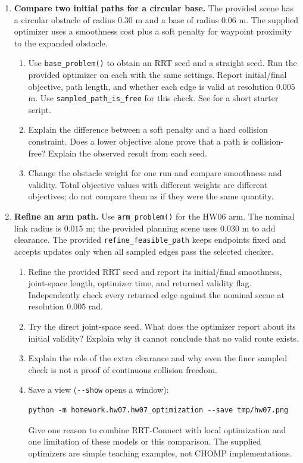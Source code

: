 \newpage
\begin{enumerate}[start=3]
\item \textbf{Compare two initial paths for a circular base.}
The provided scene has a circular obstacle of radius $0.30$ m and a base of
radius $0.06$ m. The supplied optimizer uses a smoothness cost plus a soft
penalty for waypoint proximity to the expanded obstacle.
\begin{enumerate}
\item Use \texttt{base\_problem()} to obtain an RRT seed and a straight seed.
Run the provided optimizer on each with the same settings. Report initial/final
objective, path length, and whether each edge is valid at resolution $0.005$ m.
Use \texttt{sampled\_path\_is\_free} for this check.
See  for a short starter script.
\item Explain the difference between a soft penalty and a hard collision
constraint. Does a lower objective alone prove that a path is collision-free?
Explain the observed result from each seed.
\item Change the obstacle weight for one run and compare smoothness and
validity. Total objective values with different weights are different
objectives; do not compare them as if they were the same quantity.
\end{enumerate}

\item \textbf{Refine an arm path.}
Use \texttt{arm\_problem()} for the HW06 arm. The nominal link radius is
$0.015$ m; the provided planning scene uses $0.030$ m to add clearance.
The provided \texttt{refine\_feasible\_path} keeps endpoints fixed and
accepts updates only when all sampled edges pass the selected checker.
\begin{enumerate}
\item Refine the provided RRT seed and report its initial/final smoothness,
joint-space length, optimizer time, and returned validity flag. Independently
check every returned edge against the nominal scene at resolution $0.005$ rad.
\item Try the direct joint-space seed. What does the optimizer report about
its initial validity? Explain why it cannot conclude that no valid route exists.
\item Explain the role of the extra clearance and why even the finer sampled
check is not a proof of continuous collision freedom.
\item Save a view (\texttt{-{}-show} opens a window):
\begin{lstlisting}
python -m homework.hw07.hw07_optimization --save tmp/hw07.png
\end{lstlisting}
Give one reason to combine RRT-Connect with local
optimization and one limitation of these models or this comparison. The
supplied optimizers are simple teaching examples, not CHOMP implementations.
\end{enumerate}


\end{enumerate}
